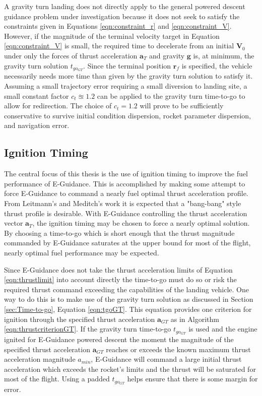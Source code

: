 A gravity turn landing does not directly apply to the general powered descent guidance problem under investigation because it does not seek to satisfy the constraints given in Equations \ref{eqn:constraint_r} and \ref{eqn:constraint_V}. However, if the magnitude of the terminal velocity target in Equation \ref{eqn:constraint_V} is small, the required time to decelerate from an initial $\boldsymbol{V}_0$ under only the forces of thrust acceleration $\boldsymbol{a}_T$ and gravity $\boldsymbol{g}$ is, at minimum, the gravity turn solution $t_{go_{GT}}$. Since the terminal position $\boldsymbol{r}_f$ is specified, the vehicle necessarily needs more time than given by the gravity turn solution to satisfy it. Assuming a small trajectory error requiring a small diversion to landing site, a small constant factor $ c_t \approxeq 1.2$ can be applied to the gravity turn time-to-go to allow for redirection. The choice of $c_t = 1.2$ will prove to be sufficiently conservative to survive initial condition dispersion, rocket parameter dispersion, and navigation error. 

\subsection{Ignition Timing} \label{sec:ignitiontiming}
The central focus of this thesis is the use of ignition timing to improve the fuel performance of E-Guidance. This is accomplished by making some attempt to force E-Guidance to command a nearly fuel optimal thrust acceleration profile. From Leitmann's\:\cite{LEITMANN} and Meditch's\:\cite{MEDITCH} work it is expected that a "bang-bang" style thrust profile is desirable. With E-Guidance controlling the thrust acceleration vector $\bm{a}_T$, the ignition timing may be chosen to force a nearly optimal solution. By choosing a time-to-go which is short enough that the thrust magnitude commanded by E-Guidance saturates at the upper bound for most of the flight, nearly optimal fuel performance may be expected.

Since E-Guidance does not take the thrust acceleration limits of Equation \ref{eqn:thrustlimit} into account directly the time-to-go must do so or risk the required thrust command exceeding the capabilities of the landing vehicle. One way to do this is to make use of the gravity turn solution as discussed in Section \ref{sec:Time-to-go}, Equation \ref{eqn:tgoGT}. This equation provides one criterion for ignition through the specified thrust acceleration $\bm{a}_{GT}$ as in Algorithm \ref{eqn:thrustcriterionGT}. If the gravity turn time-to-go $t_{go_{GT}}$ is used and the engine ignited for E-Guidance powered descent the moment the magnitude of the specified thrust acceleration $\bm{a}_{GT}$ reaches or exceeds the known maximum thrust acceleration magnitude $a_{min}$, E-Guidance will command a large initial thrust acceleration which exceeds the rocket's limits and the thrust will be saturated for most of the flight. Using a padded $t_{go_{GT}}$ helps ensure that there is some margin for error.

